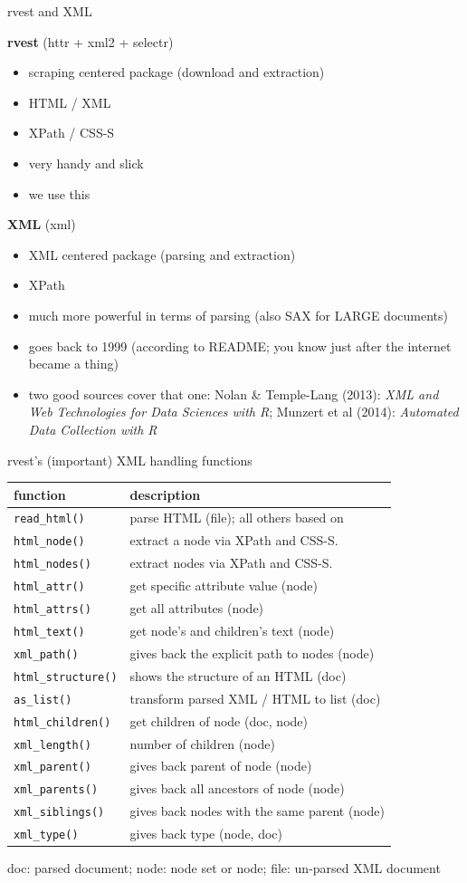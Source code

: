 \documentclass[ignorenonframetext,]{beamer}
\providecommand{\tightlist}{%
  \setlength{\itemsep}{0pt}\setlength{\parskip}{0pt}}
\begin{document}
\begin{frame}{rvest and XML}

\textbf{rvest} (httr + xml2 + selectr)

\begin{itemize}
\tightlist
\item
  scraping centered package (download and extraction)
\item
  HTML / XML
\item
  XPath / CSS-S
\item
  very handy and slick
\item
  we use this
\end{itemize}

\textbf{XML} (xml)

\begin{itemize}
\tightlist
\item
  XML centered package (parsing and extraction)
\item
  XPath
\item
  much more powerful in terms of parsing (also SAX for LARGE documents)
\item
  goes back to 1999 (according to README; you know just after the
  internet became a thing)
\item
  two good sources cover that one: Nolan \& Temple-Lang (2013):
  \emph{XML and Web Technologies for Data Sciences with R}; Munzert et
  al (2014): \emph{Automated Data Collection with R}
\end{itemize}

\end{frame}

\begin{frame}[fragile]{rvest's (important) XML handling functions}

\begin{longtable}[c]{@{}ll@{}}
\toprule
function & description\tabularnewline
\midrule
\endhead
\texttt{read\_html()} & parse HTML (file); all others based
on\tabularnewline
\texttt{html\_node()} & extract a node via XPath and
CSS-S.\tabularnewline
\texttt{html\_nodes()} & extract nodes via XPath and
CSS-S.\tabularnewline
\texttt{html\_attr()} & get specific attribute value
(node)\tabularnewline
\texttt{html\_attrs()} & get all attributes (node)\tabularnewline
\texttt{html\_text()} & get node's and children's text
(node)\tabularnewline
\texttt{xml\_path()} & gives back the explicit path to nodes
(node)\tabularnewline
\texttt{html\_structure()} & shows the structure of an HTML
(doc)\tabularnewline
\texttt{as\_list()} & transform parsed XML / HTML to list
(doc)\tabularnewline
\texttt{html\_children()} & get children of node (doc,
node)\tabularnewline
\texttt{xml\_length()} & number of children (node)\tabularnewline
\texttt{xml\_parent()} & gives back parent of node (node)\tabularnewline
\texttt{xml\_parents()} & gives back all ancestors of node
(node)\tabularnewline
\texttt{xml\_siblings()} & gives back nodes with the same parent
(node)\tabularnewline
\texttt{xml\_type()} & gives back type (node, doc)\tabularnewline
\bottomrule
\end{longtable}

doc: parsed document; node: node set or node; file: un-parsed XML
document

\end{frame}
\end{document}
